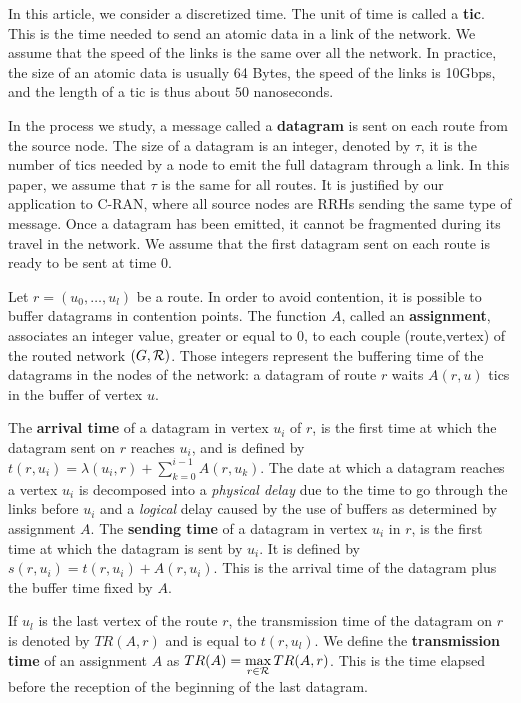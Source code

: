\documentclass[english]{article}
\begin{document}
 		In this article, we consider a discretized time. The unit of time is called a {\bf tic}. This is the time needed to send an atomic data in a link of the network. We assume that the speed of the links is the same over all the network. In practice, the size of an atomic data is usually 64 Bytes, the speed of the links is 10Gbps, and the length of a tic is thus about $50$ nanoseconds.

        In the process we study, a message called a {\bf datagram} is sent on each route from the source node. The size of a datagram is an integer, denoted by $\tau$, it is the number of tics needed by a node to emit the full datagram through a link.  In this paper, we assume that $\tau$ is the same for all routes. It is justified by our application to C-RAN, where all source nodes are RRHs sending the same type of message. Once a datagram has been emitted, it cannot be fragmented during its travel in the network. We assume that the first datagram sent on each route is ready to be sent at time $0$.

          Let $r=(u_0,\dots,u_l)$ be a route. In order to avoid contention, it is possible to buffer datagrams in contention points. The function $A$, called an \textbf{assignment}, associates an integer value, greater or equal to $0$, to each couple (route,vertex) of the routed network $(G,{\cal R})$. Those integers represent the buffering time of the datagrams in the nodes of the network: a datagram of route $r$ waits $A(r,u)$ tics in the buffer of vertex $u$.
          
       

 The \textbf{arrival time} of a datagram in vertex $u_i$ of $r$, is the first time at which the datagram sent on $r$ reaches $u_i$, and is defined by $t(r,u_i) = \lambda(u_i,r) + \sum_{k=0}^{i-1} A(r,u_k) $. The date at which a datagram reaches a vertex $u_i$ is decomposed into a \emph{physical delay} due to the time to go through the links before $u_i$ and a \emph{logical} delay caused by the use of buffers as determined by assignment $A$.
  The \textbf{sending time} of a datagram in vertex $u_i$ in $r$, is the first time at which the datagram is sent by $u_i$. It is defined by $s(r,u_i) = t(r,u_i) +  A(r,u_i) $. This is the arrival time of the datagram plus the buffer time fixed by $A$.
 
  If $u_l$ is the last vertex of the route $r$, the transmission time of the datagram on 
  $r$ is denoted by $TR(A,r)$ and is equal to $t(r,u_l)$. We define the \textbf{transmission time} of an assignment $A$ as $TR(A) = \displaystyle \max\limits_{r \in {\cal R}} TR(A,r) $. This is the time elapsed before the reception of the beginning of the last datagram. 
         
\end{document}
